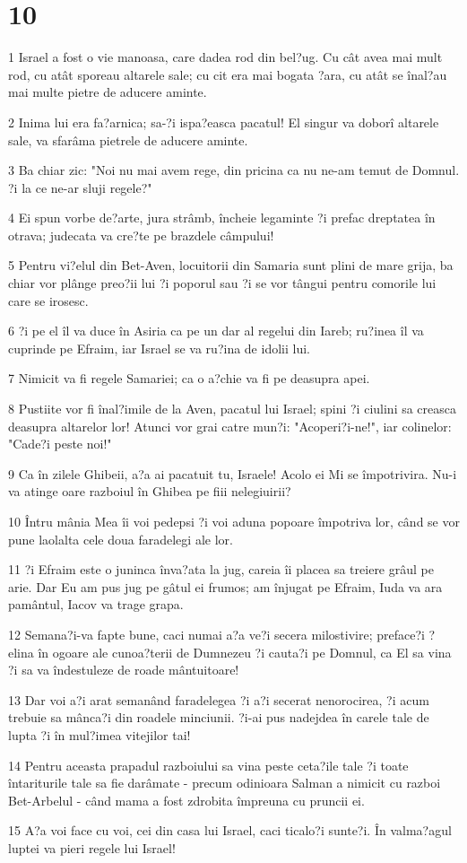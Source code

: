 \chapter{10}

\par 1 Israel a fost o vie manoasa, care dadea rod din bel?ug. Cu cât avea mai mult rod, cu atât sporeau altarele sale; cu cit era mai bogata ?ara, cu atât se înal?au mai multe pietre de aducere aminte.
\par 2 Inima lui era fa?arnica; sa-?i ispa?easca pacatul! El singur va doborî altarele sale, va sfarâma pietrele de aducere aminte.
\par 3 Ba chiar zic: "Noi nu mai avem rege, din pricina ca nu ne-am temut de Domnul. ?i la ce ne-ar sluji regele?"
\par 4 Ei spun vorbe de?arte, jura strâmb, încheie legaminte ?i prefac dreptatea în otrava; judecata va cre?te pe brazdele câmpului!
\par 5 Pentru vi?elul din Bet-Aven, locuitorii din Samaria sunt plini de mare grija, ba chiar vor plânge preo?ii lui ?i poporul sau ?i se vor tângui pentru comorile lui care se irosesc.
\par 6 ?i pe el îl va duce în Asiria ca pe un dar al regelui din Iareb; ru?inea îl va cuprinde pe Efraim, iar Israel se va ru?ina de idolii lui.
\par 7 Nimicit va fi regele Samariei; ca o a?chie va fi pe deasupra apei.
\par 8 Pustiite vor fi înal?imile de la Aven, pacatul lui Israel; spini ?i ciulini sa creasca deasupra altarelor lor! Atunci vor grai catre mun?i: "Acoperi?i-ne!", iar colinelor: "Cade?i peste noi!"
\par 9 Ca în zilele Ghibeii, a?a ai pacatuit tu, Israele! Acolo ei Mi se împotrivira. Nu-i va atinge oare razboiul în Ghibea pe fiii nelegiuirii?
\par 10 Întru mânia Mea îi voi pedepsi ?i voi aduna popoare împotriva lor, când se vor pune laolalta cele doua faradelegi ale lor.
\par 11 ?i Efraim este o juninca înva?ata la jug, careia îi placea sa treiere grâul pe arie. Dar Eu am pus jug pe gâtul ei frumos; am înjugat pe Efraim, Iuda va ara pamântul, Iacov va trage grapa.
\par 12 Semana?i-va fapte bune, caci numai a?a ve?i secera milostivire; preface?i ?elina în ogoare ale cunoa?terii de Dumnezeu ?i cauta?i pe Domnul, ca El sa vina ?i sa va îndestuleze de roade mântuitoare!
\par 13 Dar voi a?i arat semanând faradelegea ?i a?i secerat nenorocirea, ?i acum trebuie sa mânca?i din roadele minciunii. ?i-ai pus nadejdea în carele tale de lupta ?i în mul?imea vitejilor tai!
\par 14 Pentru aceasta prapadul razboiului sa vina peste ceta?ile tale ?i toate întariturile tale sa fie darâmate - precum odinioara Salman a nimicit cu razboi Bet-Arbelul - când mama a fost zdrobita împreuna cu pruncii ei.
\par 15 A?a voi face cu voi, cei din casa lui Israel, caci ticalo?i sunte?i. În valma?agul luptei va pieri regele lui Israel!

